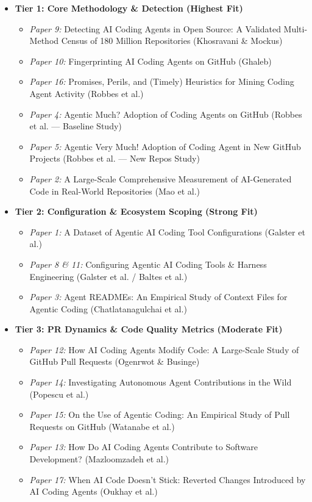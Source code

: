 \documentclass[11pt,a4paper]{article}
\begin{document}
\begin{itemize}
    \item \textbf{Tier 1: Core Methodology \& Detection (Highest Fit)}
    \begin{itemize}
        \item \textit{Paper 9:} Detecting AI Coding Agents in Open Source: A Validated Multi-Method Census of 180 Million Repositories (Khosravani \& Mockus)
        \item \textit{Paper 10:} Fingerprinting AI Coding Agents on GitHub (Ghaleb)
        \item \textit{Paper 16:} Promises, Perils, and (Timely) Heuristics for Mining Coding Agent Activity (Robbes et al.)
        \item \textit{Paper 4:} Agentic Much? Adoption of Coding Agents on GitHub (Robbes et al. --- Baseline Study)
        \item \textit{Paper 5:} Agentic Very Much! Adoption of Coding Agent in New GitHub Projects (Robbes et al. --- New Repos Study)
        \item \textit{Paper 2:} A Large-Scale Comprehensive Measurement of AI-Generated Code in Real-World Repositories (Mao et al.)
    \end{itemize}

    \item \textbf{Tier 2: Configuration \& Ecosystem Scoping (Strong Fit)}
    \begin{itemize}
        \item \textit{Paper 1:} A Dataset of Agentic AI Coding Tool Configurations (Galster et al.)
        \item \textit{Paper 8 \& 11:} Configuring Agentic AI Coding Tools \& Harness Engineering (Galster et al. / Baltes et al.)
        \item \textit{Paper 3:} Agent READMEs: An Empirical Study of Context Files for Agentic Coding (Chatlatanagulchai et al.)
    \end{itemize}

    \item \textbf{Tier 3: PR Dynamics \& Code Quality Metrics (Moderate Fit)}
    \begin{itemize}
        \item \textit{Paper 12:} How AI Coding Agents Modify Code: A Large-Scale Study of GitHub Pull Requests (Ogenrwot \& Businge)
        \item \textit{Paper 14:} Investigating Autonomous Agent Contributions in the Wild (Popescu et al.)
        \item \textit{Paper 15:} On the Use of Agentic Coding: An Empirical Study of Pull Requests on GitHub (Watanabe et al.)
        \item \textit{Paper 13:} How Do AI Coding Agents Contribute to Software Development? (Mazloomzadeh et al.)
        \item \textit{Paper 17:} When AI Code Doesn't Stick: Reverted Changes Introduced by AI Coding Agents (Oukhay et al.)
    \end{itemize}


\end{itemize}
\end{document}

